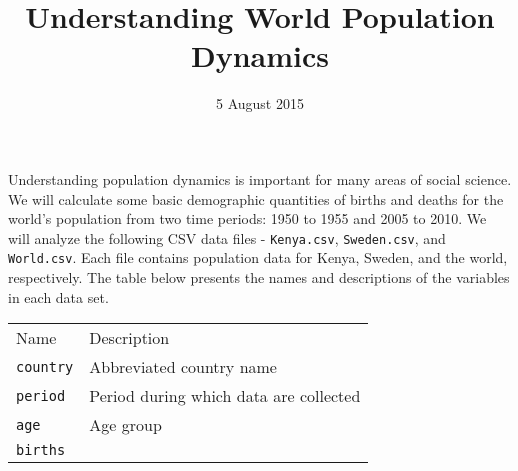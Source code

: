 \documentclass[]{article}
\title{Understanding World Population Dynamics}
\author{}
\date{5 August 2015}
\begin{document}
\maketitle


Understanding population dynamics is important for many areas of social
science. We will calculate some basic demographic quantities of births
and deaths for the world's population from two time periods: 1950 to
1955 and 2005 to 2010. We will analyze the following CSV data files -
\texttt{Kenya.csv}, \texttt{Sweden.csv}, and \texttt{World.csv}. Each
file contains population data for Kenya, Sweden, and the world,
respectively. The table below presents the names and descriptions of the
variables in each data set.

\begin{longtable}[c]{@{}ll@{}}
\toprule\addlinespace
\begin{minipage}[b]{0.25\columnwidth}\raggedright
Name
\end{minipage} & \begin{minipage}[b]{0.68\columnwidth}\raggedright
Description
\end{minipage}
\\\addlinespace
\midrule\endhead
\begin{minipage}[t]{0.25\columnwidth}\raggedright
\texttt{country}
\end{minipage} & \begin{minipage}[t]{0.68\columnwidth}\raggedright
Abbreviated country name
\end{minipage}
\\\addlinespace
\begin{minipage}[t]{0.25\columnwidth}\raggedright
\texttt{period}
\end{minipage} & \begin{minipage}[t]{0.68\columnwidth}\raggedright
Period during which data are collected
\end{minipage}
\\\addlinespace
\begin{minipage}[t]{0.25\columnwidth}\raggedright
\texttt{age}
\end{minipage} & \begin{minipage}[t]{0.68\columnwidth}\raggedright
Age group
\end{minipage}
\\\addlinespace
\begin{minipage}[t]{0.25\columnwidth}\raggedright
\texttt{births}
\end{minipage} & \begin{minipage}[t]{0.68\columnwidth}\raggedright

\end{minipage}
\end{longtable}
\end{document}
